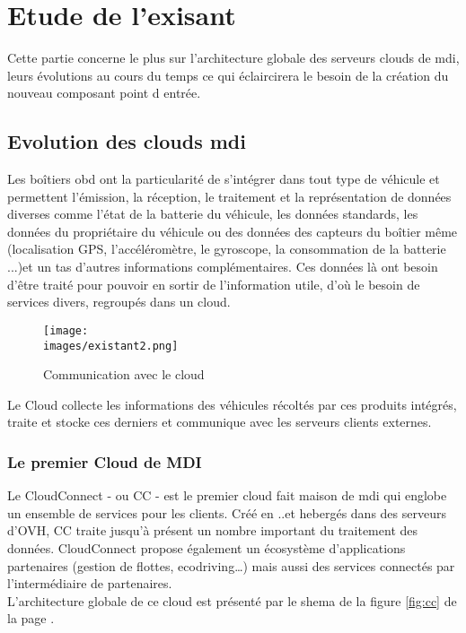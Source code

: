 \section{Etude de l'exisant}
   Cette partie concerne le plus sur l'architecture globale des serveurs clouds de \gls{mdi}, leurs évolutions 
   au cours du temps ce qui éclaircirera le besoin de la création du nouveau composant 
   point d entrée.  

   \subsection{Evolution des clouds \gls{mdi}}
   Les boîtiers \gls{obd} ont la particularité de s’intégrer dans tout type de véhicule et permettent
   l’émission, la réception, le traitement et la représentation de données diverses comme
   l'état de la batterie du véhicule, les données standards, les données du propriétaire du
   véhicule ou des données des capteurs du boîtier même (localisation GPS,
   l’accéléromètre, le gyroscope, la consommation de la batterie ...)et un tas d'autres informations complémentaires.
   Ces données là ont besoin d'être traité pour pouvoir en sortir de l'information utile, d'où le besoin de services divers, regroupés 
   dans un cloud. \\ [0.3cm]
     \begin{figure}[ht]
        \centering
        \texttt{[image: \\images/existant2.png]}
        \caption{Communication avec le cloud}
    \end{figure}
        
        Le Cloud collecte les informations des véhicules récoltés par ces produits intégrés, traite et stocke ces 
   derniers et communique avec les serveurs clients externes.\\[0.3cm]


    \subsubsection{Le premier Cloud de MDI}
       
    
         Le CloudConnect - ou \gls{CC} - est le premier cloud fait maison de \gls{mdi} qui englobe un ensemble 
        de services pour les clients. Créé en ..et hebergés dans des serveurs d'OVH, \gls{CC} traite 
        jusqu'à présent un nombre important du traitement des données. CloudConnect propose également un écosystème d’applications partenaires (gestion de flottes, ecodriving…) 
        mais aussi des services connectés par l’intermédiaire de partenaires. \\ [0.2cm]
        L'architecture globale de ce cloud est présenté par le shema de la figure \ref{fig:cc} de la page \pageref{fig:cc}.

